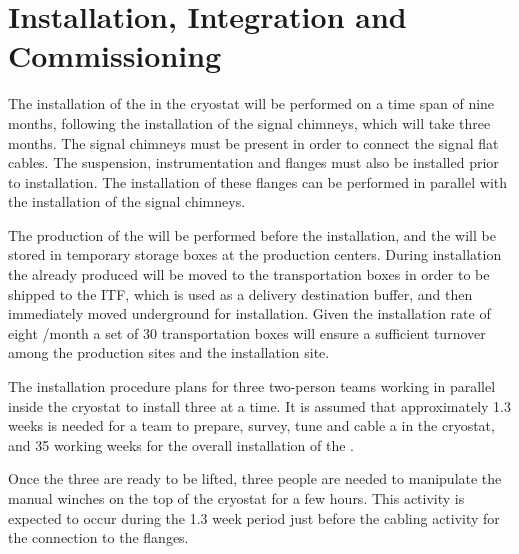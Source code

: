 \section{Installation, Integration and Commissioning}
\label{sec:fddp-crp-install}

The installation of the  in the cryostat will be performed on a time span of nine  months, following the installation of the signal chimneys, which will take three months. The signal chimneys must be present in order to %
connect the  signal flat cables. The suspension, instrumentation and  flanges must also be  installed prior to  installation. The installation of these flanges can be performed in parallel with the installation of the signal chimneys. 

The production of the  will be performed before the installation, and the  will be stored in temporary storage boxes at the production centers. During installation the already produced  will be moved to the transportation boxes in order to be shipped to the ITF, which is used as a delivery destination buffer, and then immediately moved underground for installation. Given the installation rate of eight /month a set of \num{30} transportation boxes will ensure a sufficient turnover among the production sites and the installation site.


The installation procedure %
plans for three two-person teams working in parallel inside the cryostat to %
install three  at a time. It is assumed that %
approximately \num{1.3} weeks is needed for a team to prepare, survey, tune and cable a  in the  cryostat, and \num{35} working weeks for the overall installation of the \dptotcrp {}.

Once the three  are ready to be lifted, three people are needed to manipulate the manual winches on the top of the cryostat for a few hours. This activity is expected to occur during the \num{1.3} week period just before the cabling activity for the connection to the flanges.

